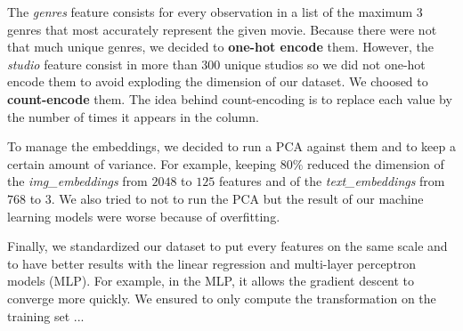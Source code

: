 The \textit{genres} feature consists for every observation in a list of the maximum $3$ genres that most accurately represent the given movie. Because there were not that much unique genres, we decided to \textbf{one-hot encode} them. However, the \textit{studio} feature consist in more than $300$ unique studios so we did not one-hot encode them to avoid exploding the dimension of our dataset. We choosed to \textbf{count-encode} them. The idea behind count-encoding is to replace each value by the number of times it appears in the column.

To manage the embeddings, we decided to run a PCA against them and to keep a certain amount of variance. For example, keeping $80\%$ reduced the dimension of the \textit{img\_embeddings} from $2048$ to $125$ features and of the \textit{text\_embeddings} from $768$ to $3$. We also tried to not to run the PCA but the result of our machine learning models were worse because of overfitting.

Finally, we standardized our dataset to put every features on the same scale and to have better results with the linear regression and multi-layer perceptron models (MLP). For example, in the MLP, it allows the gradient descent to converge more quickly. We ensured to only compute the transformation on the training set ...